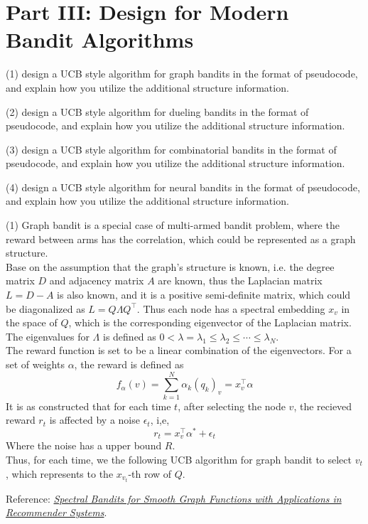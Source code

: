 \section{Part III: Design for Modern Bandit Algorithms }
(1) design a UCB style algorithm for graph bandits in the format of pseudocode, and explain how you utilize the additional structure information.

(2) design a UCB style algorithm for dueling bandits in the format of pseudocode, and explain how you utilize the additional structure information.

(3) design a UCB style algorithm for combinatorial bandits in the format of pseudocode, and explain how you utilize the additional structure information.

(4) design a UCB style algorithm for neural bandits in the format of pseudocode, and explain how you utilize the additional structure information.

\solution

(1) Graph bandit is a special case of multi-armed bandit problem, where the reward between arms has the correlation, which could be represented as a graph structure. \\
Base on the assumption that the graph's structure is known, i.e. the degree matrix $D$ and adjacency matrix $A$ are known, thus the Laplacian matrix $L = D - A$ is also known, and it is a positive semi-definite matrix, which could be diagonalized as $L = Q \Lambda Q^\top$. Thus each node has a spectral embedding $x_v$ in the space of $Q$, which is the corresponding eigenvector of the Laplacian matrix. The eigenvalues for $\Lambda$ is defined as $0<\lambda = \lambda_1\leq \lambda_2\leq\cdots\leq\lambda_N$. \\
The reward function is set to be a linear combination of the eigenvectors. For a set of weights $\alpha$, the reward is defined as
$$f_{\alpha}(v)=\sum_{k=1}^N\alpha_k(q_k)_v=x_v^{\top}\alpha$$
It is as constructed that for each time $t$, after selecting the node $v$, the recieved reward $r_t$ is affected by a noise $\epsilon_t$, i,e,
$$r_t = x_v^{\top}\alpha^* + \epsilon_t$$
Where the noise has a upper bound $R$. \\
Thus, for each time, we the following UCB algorithm for graph bandit to select $v_t$, which represents to the $x_{v_t}$-th row of $Q$.

Reference: \href{https://inria.hal.science/hal-01045036/document}{\textit{Spectral Bandits for Smooth Graph Functions with
Applications in Recommender Systems}}.

